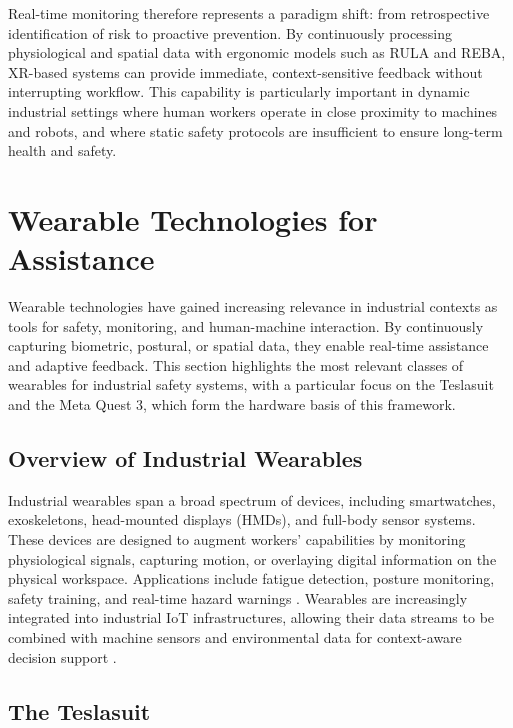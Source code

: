 Real-time monitoring therefore represents a paradigm shift: from retrospective identification of risk to proactive prevention. By continuously processing physiological and spatial data with ergonomic models such as RULA and REBA, XR-based systems can provide immediate, context-sensitive feedback without interrupting workflow. This capability is particularly important in dynamic industrial settings where human workers operate in close proximity to machines and robots, and where static safety protocols are insufficient to ensure long-term health and safety.


\section{Wearable Technologies for Assistance}
Wearable technologies have gained increasing relevance in industrial contexts as tools
for safety, monitoring, and human-machine interaction. By continuously capturing
biometric, postural, or spatial data, they enable real-time assistance and adaptive
feedback. This section highlights the most relevant classes of wearables for industrial
safety systems, with a particular focus on the Teslasuit and the Meta Quest 3, which
form the hardware basis of this framework.

\subsection{Overview of Industrial Wearables}

Industrial wearables span a broad spectrum of devices, including smartwatches,
exoskeletons, head-mounted displays (HMDs), and full-body sensor systems.
These devices are designed to augment workers’ capabilities by monitoring
physiological signals, capturing motion, or overlaying digital information on the
physical workspace. Applications include fatigue detection, posture monitoring,
safety training, and real-time hazard warnings \cite{de2019industrialwearables,syberfeldt2016vrar}. 
Wearables are increasingly integrated into industrial IoT infrastructures, allowing 
their data streams to be combined with machine sensors and environmental data 
for context-aware decision support \cite{portman2022xrsurvey}.

\subsection{The Teslasuit}

